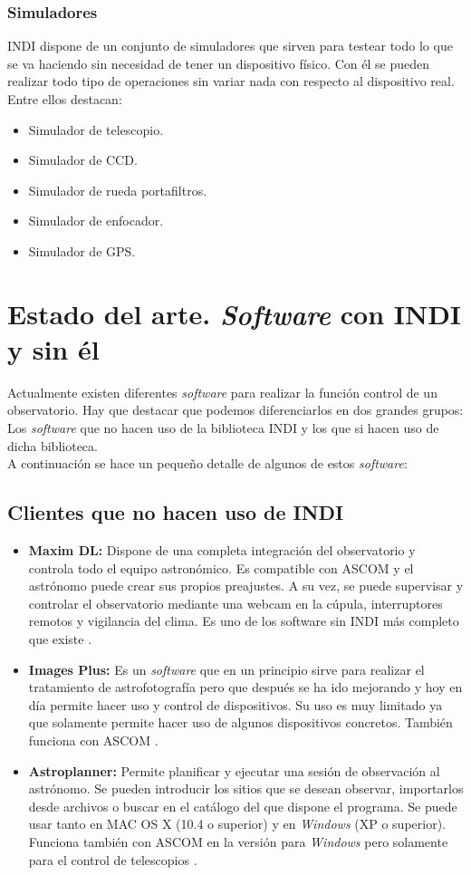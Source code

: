 \subsubsection{Simuladores}
INDI dispone de un conjunto de simuladores que sirven para testear todo lo que se va haciendo sin necesidad de tener un dispositivo físico. Con él se pueden realizar todo tipo de operaciones sin variar nada con respecto al dispositivo real. Entre ellos destacan:
\begin{itemize}
  \item Simulador de telescopio.
  \item Simulador de CCD.
  \item Simulador de rueda portafiltros.
  \item Simulador de enfocador.
  \item Simulador de GPS.
\end{itemize}

\section{Estado del arte. \textit{Software} con INDI y sin él}
Actualmente existen diferentes \textit{software} para realizar la función control de un observatorio. Hay que destacar que podemos diferenciarlos en dos grandes grupos: Los \textit{software} que no hacen uso de la biblioteca INDI y los que si hacen uso de dicha biblioteca.\\

A continuación se hace un pequeño detalle de algunos de estos \textit{software}:

\subsection{Clientes que no hacen uso de INDI}
\begin{itemize}
  \item \textbf{Maxim DL:} Dispone de una completa integración del observatorio y controla todo el equipo astronómico. Es compatible con ASCOM y el astrónomo puede crear sus propios preajustes. A su vez, se puede supervisar y controlar el observatorio mediante una webcam en la cúpula, interruptores remotos y vigilancia del clima. Es uno de los software sin INDI más completo que existe \cite{MaximDL}.
  \item \textbf{Images Plus:} Es un \textit{software} que en un principio sirve para realizar el tratamiento de astrofotografía pero que después se ha ido mejorando y hoy en día permite hacer uso y control de dispositivos. Su uso es muy limitado ya que solamente permite hacer uso de algunos dispositivos concretos. También funciona con ASCOM \cite{ImagesPlus}.
  \item \textbf{Astroplanner:} Permite planificar y ejecutar una sesión de observación al astrónomo. Se pueden introducir los sitios que se desean observar, importarlos desde archivos o buscar en el catálogo del que dispone el programa. Se puede usar tanto en MAC OS X (10.4 o superior) y en \textit{Windows} (XP o superior). Funciona también con ASCOM en la versión para \textit{Windows} pero solamente para el control de telescopios \cite{Astroplanner}.
\end{itemize}

